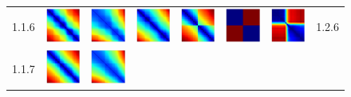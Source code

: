 \documentclass[bachelor, nocolorlinks, printoneside]{seuthesis} %
\begin{document}
\begin{Main}
\begin{figure}[ht!]
\begin{centering}
\begin{tabular}{cccc|cccc}
        1.1.6 &\includegraphics[width=0.12\columnwidth,keepaspectratio]{figs/toyset_matrices/cluster_5by20_6_1.png} &
        \includegraphics[width=0.12\columnwidth,keepaspectratio]{figs/toyset_matrices/cluster_5by20_6_2.png} &
        \includegraphics[width=0.12\columnwidth,keepaspectratio]{figs/toyset_matrices/cluster_5by20_6_3.png} &  
        \includegraphics[width=0.12\columnwidth,keepaspectratio]{figs/toyset_matrices/cluster_2by10_6_1.png} &
        \includegraphics[width=0.12\columnwidth,keepaspectratio]{figs/toyset_matrices/cluster_2by10_6_2.png} &
        \includegraphics[width=0.12\columnwidth,keepaspectratio]{figs/toyset_matrices/cluster_2by10_6_3.png}& 1.2.6\\
        1.1.7 &\includegraphics[width=0.12\columnwidth,keepaspectratio]{figs/toyset_matrices/cluster_5by20_7_1.png} &
        \includegraphics[width=0.12\columnwidth,keepaspectratio]{figs/toyset_matrices/cluster_5by20_7_2.png} &

\end{tabular}
\end{centering}
\end{figure}
\end{Main}
\end{document}
